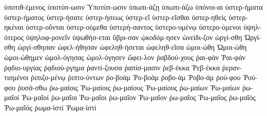 {ὑποτιθ-έμενος
ὑποτύπ-ωσιν
Ὑποτύπ-ωσιν
ὑπωπι-άζῃ
ὑπωπι-άζω
ὑπόνοι-αι
ὑστερ-ήματα
ὑστερ-ήματος
ὑστερ-ήσατε
ὑστερ-ήσεως
ὑστερ-εῖ
ὑστερ-εῖσθαι
ὑστερ-ηθεὶς
ὑστερ-ηκέναι
ὑστερ-οῦνται
ὑστερ-ούμεθα
ὑστερή-σαντος
ὑστερο-υμένῳ
ὑστερο-ύμενοι
ὑψηλ-ότερος
ὑψηλοφ-ρονεῖν
ὑψωθήσ-εται
ὕβρι-σαν
ᾠκοδόμ-ησεν
ὠνείδι-ζον
ὠργί-σθη
Ὠργί-σθη
ὠργί-σθησαν
ὠφελ-ήθησαν
ὠφεληθ-ήσεται
ὠφεληθ-εῖσα
ὡμοι-ώθη
Ὡμοι-ώθη
ὡμοι-ώθημεν
ὡμολ-όγησας
ὡμολ-όγησεν
ὤφει-λον
ῥαβδού-χους
ῥαι-φάν
Ῥαι-φάν
ῥᾳδιο-υργίας
ῥᾳδιού-ργημα
ῥαντί-ζουσα
ῥαπίσ-μασιν
ῥεβ-έκκα
Ῥεβ-έκκα
ῥεραν-τισμένοι
ῥιπιζο-μένῳ
ῥιπτο-ύντων
ῥο-βοὰμ
Ῥο-βοὰμ
ῥοβο-άμ
Ῥοβο-άμ
ῥού-φου
Ῥού-φου
ῥυσά-σθω
ῥω-μαίοις
Ῥω-μαίοις
ῥω-μαίους
Ῥω-μαίους
ῥω-μαίων
Ῥω-μαίων
ῥω-μαῖοί
Ῥω-μαῖοί
ῥω-μαῖοι
Ῥω-μαῖοι
ῥω-μαῖον
Ῥω-μαῖον
ῥω-μαῖος
Ῥω-μαῖος
ῥω-μαῖός
Ῥω-μαῖός
ῥωμα-ϊστί
Ῥωμα-ϊστί}